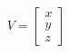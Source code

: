 \documentclass[preview]{standalone}
\begin{document}
\begin{align*}
V = \begin{bmatrix} x \\ y \\ z \end{bmatrix}
\end{align*}
\end{document}
